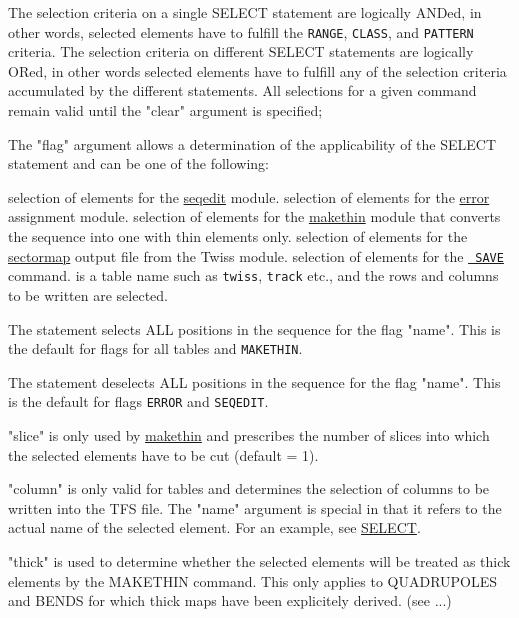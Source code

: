 The selection criteria on a single SELECT statement are logically
ANDed, in other words, selected elements have to fulfill the {\tt RANGE},
{\tt CLASS}, and {\tt PATTERN} criteria.  
The selection criteria on different SELECT statements are logically
ORed, in other words selected elements have to fulfill any of the
selection criteria accumulated by the different statements.   
All selections for a given command remain valid until the "clear" argument
is specified; 

The "flag" argument allows a determination of the applicability of the
SELECT statement and can be one of the following: 
\begin{madlist}
    selection of elements for the
     \hyperref[sec:seqedit]{seqedit} module.  
    selection of elements for the
     \hyperref[chap:error]{error} assignment module.  
    selection of elements for the
     \hyperref[chap:makethin]{makethin} module that
     converts the sequence into one with thin elements only.  
    selection of elements for the
     \hyperref[subsec:sectormap]{sectormap} output file
     from the Twiss module.  
    selection of elements for the \hyperref[sec:save]{\tt
     SAVE} command.   
    is a table name such as {\tt twiss}, {\tt track}
     etc., and the rows and columns to be written are selected.  
\end{madlist} 

The statement
selects ALL positions in the sequence for the flag "name". This is the default
for flags for all tables and {\tt MAKETHIN}.

The statement 
deselects ALL positions in the sequence for the flag "name". This is the default
for flags {\tt ERROR} and {\tt SEQEDIT}.

"slice" is only used by \hyperref[chap:makethin]{makethin} and
prescribes the number of slices into which the selected elements have to
be cut (default = 1).  

"column" is only valid for tables and determines the selection of columns
to be written into the TFS file. The "name" argument is special in that
it refers to the actual name of the selected element. For an example,
see \hyperref[sec:select]{SELECT}.  

"thick" is used to determine whether the selected elements will be
treated as thick elements by the MAKETHIN command. This only applies to
QUADRUPOLES and BENDS for which thick maps have been explicitely
derived. (see ...) 

